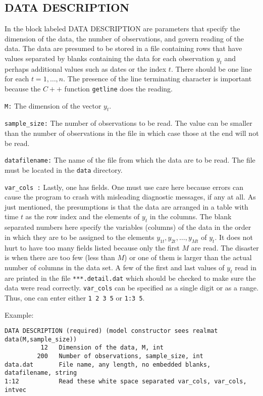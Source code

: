 \documentclass[11pt, letterpaper, notitlepage]{article}
\begin{document}
\subsection{DATA DESCRIPTION}

In the block labeled DATA DESCRIPTION are parameters that specify the dimension of the data, the number of observations, and govern reading of the data. The data are presumed to be stored in a file containing rows that have values separated by blanks containing the data for each observation $y_t$ and perhaps additional values such as dates or the index $t$. There should be one line for each $t = 1, \dots , n$. The presence of the line terminating character is important because the $C++$ function \texttt{getline} does the reading.

\texttt{M:} The dimension of the vector $y_t$.

\texttt{sample\_size:} The number of observations to be read. The value can be smaller than the number of observations in the file in which case those at the end will not be read.

\texttt{datafilename:} The name of the file from which the data are to be read. The file must be located in the \texttt{data} directory.

\texttt{var\_cols :} Lastly, one has fields. One must use care here because errors can cause the program to crash with misleading diagnostic messages, if any at all. As just mentioned, the presumptions is that the data are arranged in a table with time $t$ as the row index and the elements of $y_t$ in the columns. The blank separated numbers here specify the variables (columns) of the data in the order in which they are to be assigned to the elements $y_{1t}, y_{2t}, \dots, y_{Mt}$ of $y_t$. It does not hurt to have too many fields listed because only the first $M$ are read. The disaster is when there are too few (less than $M$) or one of them is larger than the actual number of columns in the data set. A few of the first and last values of $y_t$ read in are printed in the file \texttt{***.detail.dat} which should be checked to make sure the data were read correctly. \texttt{var\_cols} can be specified as a single digit or as a range. Thus, one can enter either \texttt{1 2 3 5} or \texttt{1:3 5}.


Example:

\begin{verbatim}
DATA DESCRIPTION (required) (model constructor sees realmat data(M,sample_size))
          12   Dimension of the data, M, int
         200   Number of observations, sample_size, int
data.dat       File name, any length, no embedded blanks, datafilename, string
1:12           Read these white space separated var_cols, var_cols, intvec

\end{verbatim}
\end{document}
